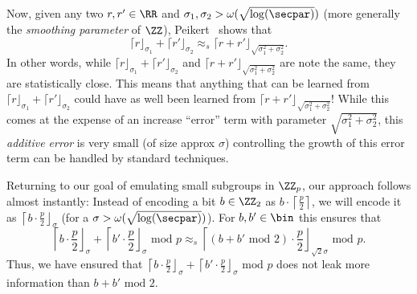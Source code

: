Now, given any two $r,r' \in \RR$ and $\sigma_1,\sigma_2 > \omega(\sqrt{\log(\secpar)})$ (more generally the \emph{smoothing parameter} of $\ZZ$), Peikert~\cite{C:Peikert10} shows that
\[
\lceil r \rfloor_{\sigma_1} + \lceil r' \rfloor_{\sigma_2} \approx_s \lceil r + r' \rfloor_{\sqrt{\sigma_1^2 + \sigma_2^2}}.
\]
In other words, while $\lceil r \rfloor_{\sigma_1} + \lceil r' \rfloor_{\sigma_2}$ and $\lceil r + r' \rfloor_{\sqrt{\sigma_1^2 + \sigma_2^2}}$ are note the same, they are statistically close. This means that anything that can be learned from $\lceil r \rfloor_{\sigma_1} + \lceil r' \rfloor_{\sigma_2}$ could have as well been learned from $\lceil r + r' \rfloor_{\sqrt{\sigma_1^2 + \sigma_2^2}}$! While this comes at the expense of an increase ``error'' term with parameter $\sqrt{\sigma_1^2 + \sigma_2^2}$, this \emph{additive error} is very small (of size approx $\sigma$) controlling the growth of this error term can be handled by standard techniques.

Returning to our goal of emulating small subgroups in $\ZZ_p$, our approach follows almost instantly: Instead of encoding a bit $b \in \ZZ_2$ as $b \cdot\left \lceil \frac{p}{2} \right\rceil$, we will encode it as $\left\lceil b \cdot \frac{p}{2} \right\rfloor_{\sigma}$ (for a $\sigma > \omega(\sqrt{\log(\secpar)})$). For $b,b' \in \bin$ this ensures that
\[
\left\lceil b \cdot \frac{p}{2} \right\rfloor_{\sigma} + \left\lceil b' \cdot \frac{p}{2}\right \rfloor_{\sigma} \text{ mod } p \approx_s\left \lceil (b + b' \text{ mod } 2) \cdot \frac{p}{2} \right\rfloor_{\sqrt{2} \sigma} \text{ mod } p.
\]
Thus, we have ensured that $\left\lceil b \cdot \frac{p}{2} \right\rfloor_{\sigma} + \left\lceil b' \cdot \frac{p}{2} \right\rfloor_{\sigma} \text{ mod } p$ does not leak more information than $b + b' \text{ mod } 2$.


